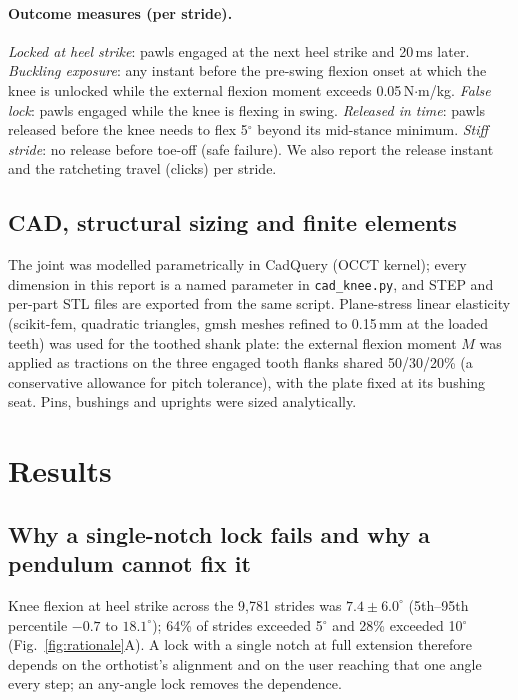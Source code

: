 \documentclass[11pt,a4paper]{article}
\begin{document}
\paragraph{Outcome measures (per stride).} \emph{Locked at heel strike}: pawls engaged at the next heel strike and 20\,ms later. \emph{Buckling exposure}: any instant before the pre-swing flexion onset at which the knee is unlocked while the external flexion moment exceeds 0.05\,N$\cdot$m/kg. \emph{False lock}: pawls engaged while the knee is flexing in swing. \emph{Released in time}: pawls released before the knee needs to flex 5$^\circ$ beyond its mid-stance minimum. \emph{Stiff stride}: no release before toe-off (safe failure). We also report the release instant and the ratcheting travel (clicks) per stride.

\subsection{CAD, structural sizing and finite elements}
The joint was modelled parametrically in CadQuery (OCCT kernel); every dimension in this report is a named parameter in \texttt{cad\_knee.py}, and STEP and per-part STL files are exported from the same script. Plane-stress linear elasticity (scikit-fem, quadratic triangles, gmsh meshes refined to 0.15\,mm at the loaded teeth) was used for the toothed shank plate: the external flexion moment $M$ was applied as tractions on the three engaged tooth flanks shared 50/30/20\% (a conservative allowance for pitch tolerance), with the plate fixed at its bushing seat. Pins, bushings and uprights were sized analytically.

\section{Results}
\subsection{Why a single-notch lock fails and why a pendulum cannot fix it}\label{sec:pendulum}
Knee flexion at heel strike across the 9{,}781 strides was $7.4\pm6.0^\circ$ (5th--95th percentile $-0.7$ to $18.1^\circ$); 64\% of strides exceeded 5$^\circ$ and 28\% exceeded 10$^\circ$ (Fig.~\ref{fig:rationale}A). A lock with a single notch at full extension therefore depends on the orthotist's alignment and on the user reaching that one angle every step; an any-angle lock removes the dependence.
\end{document}
